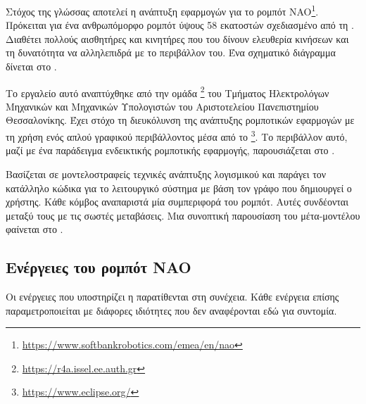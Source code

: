 Στόχος της γλώσσας αποτελεί η ανάπτυξη εφαρμογών για το ρομπότ NAO\footnote{\url{https://www.softbankrobotics.com/emea/en/nao}}.
Πρόκειται για ένα ανθρωπόμορφο ρομπότ ύψους 58 εκατοστών σχεδιασμένο από τη .
Διαθέτει πολλούς αισθητήρες και κινητήρες που του δίνουν ελευθερία κινήσεων και τη δυνατότητα να αλληλεπιδρά με το περιβάλλον του.
Ένα σχηματικό διάγραμμα δίνεται στο .

Το εργαλείο αυτό αναπτύχθηκε από την ομάδα \footnote{\url{https://r4a.issel.ee.auth.gr}}
του Τμήματος Ηλεκτρολόγων Μηχανικών και Μηχανικών Υπολογιστών του Αριστοτελείου Πανεπιστημίου Θεσσαλονίκης.
Έχει στόχο τη διευκόλυνση της ανάπτυξης ρομποτικών εφαρμογών με τη χρήση ενός απλού γραφικού περιβάλλοντος μέσα από το
 \footnote{\url{https://www.eclipse.org/}}.
Το περιβάλλον αυτό, μαζί με ένα παράδειγμα ενδεικτικής ρομποτικής εφαρμογής, παρουσιάζεται στο .

Βασίζεται σε μοντελοστραφείς τεχνικές ανάπτυξης λογισμικού και παράγει τον κατάλληλο κώδικα  για το λειτουργικό σύστημα  με βάση τον γράφο που δημιουργεί ο χρήστης.
Κάθε κόμβος αναπαριστά μία συμπεριφορά του ρομπότ.
Αυτές συνδέονται μεταξύ τους με τις σωστές μεταβάσεις.
Μια συνοπτική παρουσίαση του μέτα-μοντέλου φαίνεται στο .



\subsection{Ενέργειες του ρομπότ NAO}
\newcommand{\defintent}[2][]{\def\tmp{#2}%
    \ifthenelse{\isempty{#1}}{%
        \lowercase{\def\tmpurlhash{#2}}%
    }{%
        \lowercase{\def\tmpurlhash{#1}}%
    }%
    \def\tmpurl{https://r4a.issel.ee.auth.gr/nao4a/\#\tmpurlhash}%
    \StrDel{\tmp}{ }[\tmp]%
    \StrDel{\tmpurl}{ }[\tmpurl]%
    \hypersetup{urlcolor=black}%
    \item\href{\tmpurl}{\textbf{#2}}\label{intent:\tmp}:}
Οι ενέργειες που υποστηρίζει η \metamodel{} παρατίθενται στη συνέχεια.
Κάθε ενέργεια επίσης παραμετροποιείται με διάφορες ιδιότητες που δεν αναφέρονται εδώ για συντομία.

